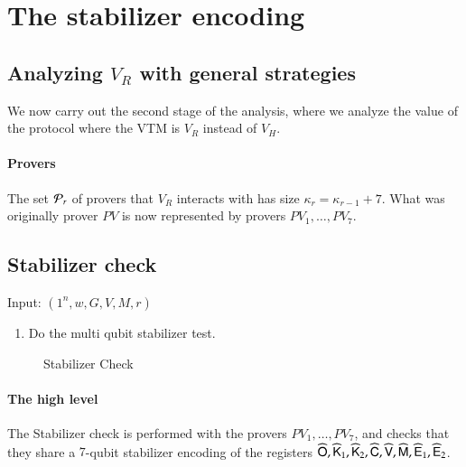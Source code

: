 \section{The stabilizer encoding}
\label{sec:stabilizer}



\subsection{Analyzing $V_R$ with general strategies}

We now carry out the second stage of the analysis, where we analyze the value of the protocol where the VTM is $V_R$ instead of $V_H$. 

\paragraph{Provers} The set $\mathcal P_r$ of provers that $V_R$ interacts with has size $\kappa_r = \kappa_{r-1} + 7$. What was originally prover $PV$ is now represented by provers $PV_1,\ldots,PV_7$. 

\subsection{Stabilizer check}

\begin{center}
\begin{mdframed}
    Input: $(1^n,w,G,V,M,r)$ \\
	\begin{enumerate}
		\item Do the multi qubit stabilizer test.
	\end{enumerate}    
\end{mdframed}
\end{center}
\begin{figure}[H]
\caption{Stabilizer Check}
\label{fig:stabilizer_check}
\end{figure}

\paragraph{The high level} The Stabilizer check is performed with the provers $PV_1,\ldots,PV_7$, and checks that they share a $7$-qubit stabilizer encoding of the registers $\widehat{{\mathsf{O}}}, \widehat{{\mathsf{K}}}_1,\widehat{{\mathsf{K}}}_2, \widehat{{\mathsf{C}}}, \widehat{{\mathsf{V}}}, \widehat{{\mathsf{M}}}, \widehat{{\mathsf{E}}}_1, \widehat{{\mathsf{E}}}_2$. 


